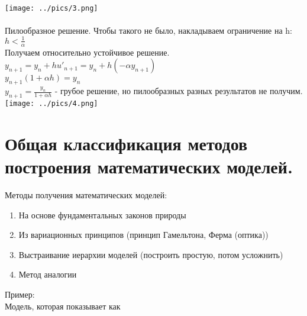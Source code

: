 \documentclass[12pt,a4paper]{article}
\begin{document}
	\\ 
	\texttt{[image: ../pics/3.png]}\\
	\\Пилообразное решение. Чтобы такого не было, накладываем ограничение на h:\\
	$h < \frac{1}{\alpha}$\\
	Получаем относительно устойчивое решение.
	\\
	$y_{n+1} = y_n + h u'_{n+1} = y_n + h (-\alpha y_{n+1})$\\
	$y_{n+1} (1 + \alpha h) = y_n$\\
	$y_{n+1} = \displaystyle \frac{y_n}{1 + \alpha h}$ - грубое решение, но пилообразных разных результатов не получим.\\
	
	\texttt{[image: ../pics/4.png]}
	
	\section{Общая классификация методов построения математических моделей.}
	Методы получения математических моделей:
	\begin{enumerate}
		\item На основе фундаментальных законов природы 
		\item Из вариационных принципов (принцип Гамельтона, Ферма (оптика))		
		\item Выстраивание иерархии моделей (построить простую, потом усложнить)
		\item Метод аналогии		
	\end{enumerate}
	Пример:\\
	Модель, которая показывает как 
\end{document}
